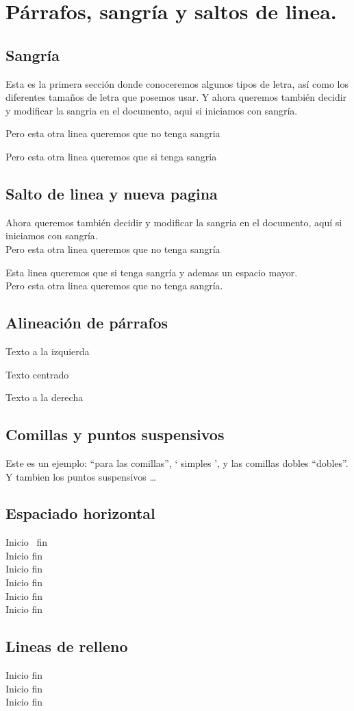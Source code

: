 \documentclass[12pt]{book}
\begin{document}
\section{Párrafos, sangría y saltos de linea.}
\subsection{Sangría}
\noindent Esta es la primera sección donde conoceremos algunos tipos de letra, así como los diferentes tamaños de letra que posemos usar. Y ahora queremos también decidir y modificar la sangria en el documento, aqui si iniciamos con sangría.

\noindent Pero esta otra linea queremos que no tenga sangria

Pero esta otra linea queremos que si tenga sangria
\subsection{Salto de linea y nueva pagina}
Ahora queremos también decidir y modificar la sangria en el documento, aquí si iniciamos con sangría.\\
Pero esta otra linea queremos que no tenga sangría\par 
Esta linea queremos que si tenga sangría y ademas un espacio mayor.\\[0mm]
Pero esta otra linea queremos que no tenga sangría.
\subsection{Alineación de párrafos}
\begin{flushleft}
Texto a la izquierda
\end{flushleft}

\begin{center}
Texto centrado
\end{center}

\begin{flushright}
Texto a la derecha
\end{flushright}

\subsection{Comillas y puntos suspensivos}
Este es un ejemplo: ``para las comillas'',  ` simples ', y las comillas dobles ``dobles''.\\
Y tambien los puntos suspensivos \dots

\subsection{Espaciado horizontal}
\noindent Inicio \, fin\\[0.2cm]
Inicio \quad fin\\[0.2cm]
Inicio \qquad fin\\[0.2cm]
Inicio \hspace{3cm} fin\\[0.2cm]
Inicio \hspace{5cm} fin\\[0.2cm]
Inicio \hfill fin\\[0.2cm]
\subsection{Lineas de relleno}
\noindent Inicio \hfill fin\\[0.5cm]
Inicio \hrulefill fin\\[0.5cm]
Inicio \dotfill fin
\end{document}
